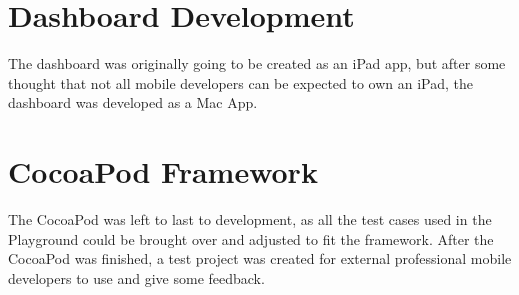 \section{Dashboard Development}

The dashboard was originally going to be created as an iPad app, but after some thought that not all mobile developers can be expected to own an iPad, the dashboard was developed as a Mac App. 

\section{CocoaPod Framework}

The CocoaPod was left to last to development, as all the test cases used in the Playground could be brought over and adjusted to fit the framework. After the CocoaPod was finished, a test project was created for external professional mobile developers to use and give some feedback.
